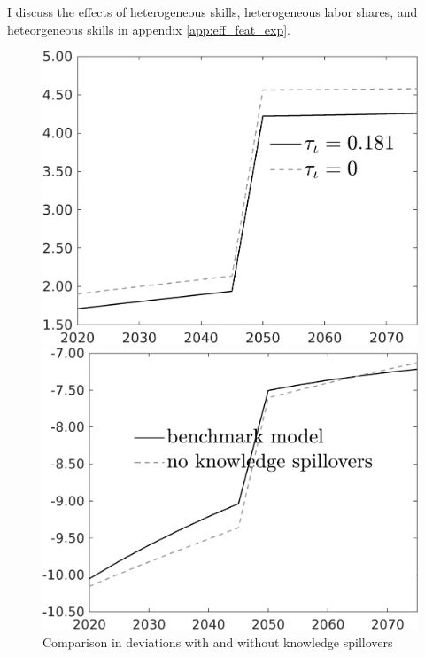 I discuss the effects of heterogeneous skills, heterogeneous labor shares, and heteorgeneous skills in appendix \ref{app:eff_feat_exp}. 
 \begin{figure}[h!!]
	\centering
	\caption{Comparison in deviations with and without knowledge spillovers}\label{fig:Limit_nsk0_xgr0_know_Devs}
		\begin{minipage}[]{0.32\textwidth}
		\includegraphics[width=1\textwidth]{../../codding_model/own_basedOnFried/optimalPol_010922_revision/figures/all_13Sept22/CompTauf_bytaul_Reg0_tauf_spillover0_nsk0_xgr0_knspil1_sep0_LFlimit1_emsbase0_countec0_GovRev0_etaa0.79_lgd1.png}
	\end{minipage}	
\begin{minipage}[]{0.32\textwidth}
		\includegraphics[width=1\textwidth]{../../codding_model/own_basedOnFried/optimalPol_010922_revision/figures/all_13Sept22/CompTaufPER_bytaul_KN_Reg0_tauf_spillover0_nsk0_xgr0_knspil0_sep0_LFlimit1_emsbase0_countec0_GovRev0_etaa0.79_lgd1.png} 

\end{minipage}
\end{figure}
